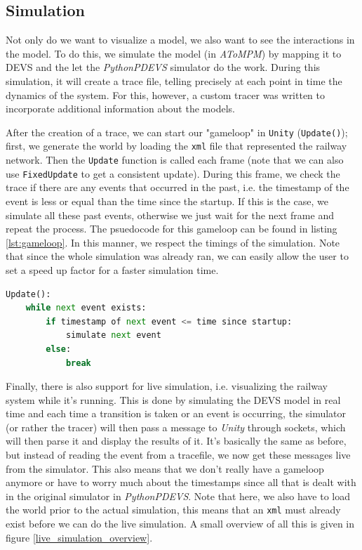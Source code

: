 \documentclass{article}
\begin{document}
\subsection{Simulation}

Not only do we want to visualize a model, we also want to see the interactions in the model. To do this, we simulate the model (in \textit{AToMPM}) by mapping it to DEVS and the let the \textit{PythonPDEVS} simulator do the work. During this simulation, it will create a trace file, telling precisely at each point in time the dynamics of the system. For this, however, a custom tracer was written to incorporate additional information about the models.

After the creation of a trace, we can start our "gameloop" in \texttt{Unity} (\texttt{Update()}); first, we generate the world by loading the \texttt{xml} file that represented the railway network. Then the \texttt{Update} function is called each frame (note that we can also use \texttt{FixedUpdate} to get a consistent update). During this frame, we check the trace if there are any events that occurred in the past, i.e. the timestamp of the event is less or equal than the time since the startup. If this is the case, we simulate all these past events, otherwise we just wait for the next frame and repeat the process. The psuedocode for this gameloop can be found in listing \ref{lst:gameloop}. In this manner, we respect the timings of the simulation. Note that since the whole simulation was already ran, we can easily allow the user to set a speed up factor for a faster simulation time.

\begin{lstlisting}[language=python, caption=Pseudocode Gameloop, label={lst:gameloop}]
Update():
    while next event exists:
        if timestamp of next event <= time since startup:
            simulate next event
        else:
            break
\end{lstlisting}

Finally, there is also support for live simulation, i.e. visualizing the railway system while it's running. This is done by simulating the DEVS model in real time and each time a transition is taken or an event is occurring, the simulator (or rather the tracer) will then pass a message to \textit{Unity} through sockets, which will then parse it and display the results of it. It's basically the same as before, but instead of reading the event from a tracefile, we now get these messages live from the simulator. This also means that we don't really have a gameloop anymore or have to worry much about the timestamps since all that is dealt with in the original simulator in \textit{PythonPDEVS}. Note that here, we also have to load the world prior to the actual simulation, this means that an \texttt{xml} must already exist before we can do the live simulation. A small overview of all this is given in figure \ref{live_simulation_overview}.
\end{document}
